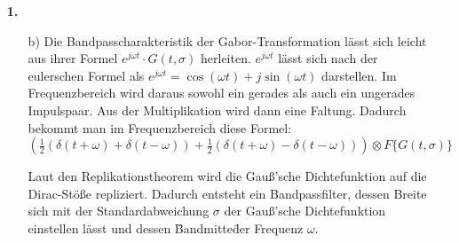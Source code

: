 \documentclass[a4paper,11pt]{article}
\author{\authorinfotitle}
\title{\titleinfo}
\date{\today}
\begin{document}
	\maketitle
	\begin{enumerate}
		\item[\textbf{1.}]
			\begin{enumerate}
				\item[b)]
				Die Bandpasscharakteristik der Gabor-Transformation lässt sich leicht aus ihrer Formel $ e^{j\omega t}\cdot G(t,\sigma)$ herleiten. $e^{j\omega t}$ lässt sich nach der eulerschen Formel als
				$e^{j\omega t} = \cos(\omega t) + j\sin(\omega t)$ darstellen.
				Im Frequenzbereich wird daraus sowohl ein gerades als auch ein ungerades Impulspaar. Aus der Multiplikation wird dann eine Faltung. Dadurch bekommt man im Frequenzbereich diese Formel: $(\frac{1}{2}(\delta(t+\omega)+\delta(t-\omega)) + \frac{1}{2}(\delta(t+\omega)-\delta(t-\omega)))\otimes F\lbrace G(t,\sigma) \rbrace$
				
				Laut den Replikationstheorem wird die Gauß'sche Dichtefunktion auf die Dirac-Stöße repliziert. Dadurch entsteht ein Bandpassfilter, dessen Breite sich mit der Standardabweichung $\sigma$ der Gauß'sche Dichtefunktion einstellen lässt und dessen \"Bandmitte\" der Frequenz $\omega$. 
			\end{enumerate}
	\end{enumerate}
\end{document}
